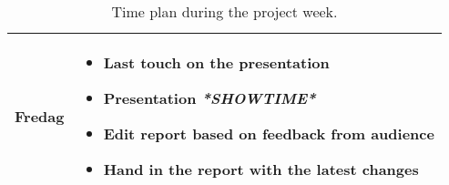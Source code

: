 \documentclass{article}
\begin{document}
\begin{table}[!ht]
\begin{tabular}{|l|p{25em}|}
\hline
\textbf{Fredag} & 
\vspace{-\baselineskip}
\begin{itemize}
\item Last touch on the presentation
\item Presentation \textit{\textbf{*SHOWTIME*}}
\item Edit report based on feedback from audience
\item Hand in the report with the latest changes
\end{itemize}\\
\hline
\end{tabular}
\caption{Time plan during the project week.}
\label{tab:time_plan}
\end{table}
\end{document}
